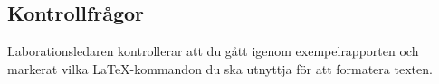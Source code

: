 \subsection*{Kontrollfrågor}
\begin{Kontrollfragor}
	\item Laborationsledaren kontrollerar att du gått igenom exempelrapporten och markerat vilka \LaTeX-kommandon du ska utnyttja för att formatera texten.


\end{Kontrollfragor}


